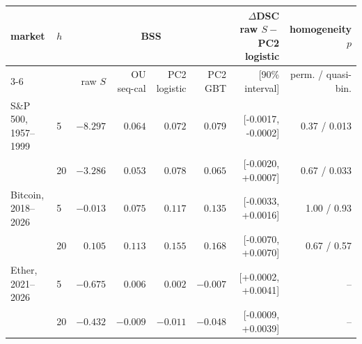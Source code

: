 \begin{tabular}{llrrrrrr}\toprule
market & $h$ & \multicolumn{4}{c}{BSS} & $\Delta$DSC raw $S-$PC2 logistic & homogeneity $p$\\
\cmidrule(lr){3-6} & & raw $S$ & OU seq-cal & PC2 logistic & PC2 GBT & [90\% interval] & perm. / quasi-bin.\\\midrule
S\&P 500, 1957--1999 & 5 & $-8.297$ & $0.064$ & $0.072$ & $0.079$ & [-0.0017, -0.0002] & 0.37 / 0.013\\
 & 20 & $-3.286$ & $0.053$ & $0.078$ & $0.065$ & [-0.0020, +0.0007] & 0.67 / 0.033\\
Bitcoin, 2018--2026 & 5 & $-0.013$ & $0.075$ & $0.117$ & $0.135$ & [-0.0033, +0.0016] & 1.00 / 0.93\\
 & 20 & $0.105$ & $0.113$ & $0.155$ & $0.168$ & [-0.0070, +0.0070] & 0.67 / 0.57\\
Ether, 2021--2026 & 5 & $-0.675$ & $0.006$ & $0.002$ & $-0.007$ & [+0.0002, +0.0041] & --\\
 & 20 & $-0.432$ & $-0.009$ & $-0.011$ & $-0.048$ & [-0.0009, +0.0039] & --\\
\bottomrule\end{tabular}
